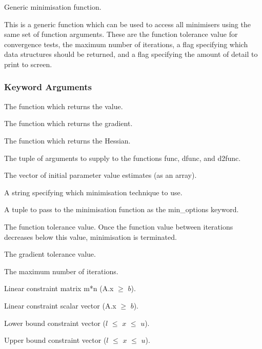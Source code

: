  Generic minimisation function. 
  

 This is a generic function which can be used to access all minimisers using the same set of function arguments.  These are the function tolerance value for convergence tests, the maximum number of iterations, a flag specifying which data structures should be returned, and a flag specifying the amount of detail to print to screen. 
  

  
 \subsubsection{Keyword Arguments} 

   The function which returns the value.   

   The function which returns the gradient.   

   The function which returns the Hessian.   

   The tuple of arguments to supply to the functions func, dfunc, and d2func.   

   The vector of initial parameter value estimates (as an array).   

   A string specifying which minimisation technique to use.   

   A tuple to pass to the minimisation function as the min\_options keyword.   

   The function tolerance value.  Once the function value between iterations decreases below this value, minimisation is terminated.   

   The gradient tolerance value.   

   The maximum number of iterations.   

   Linear constraint matrix m*n (A.x $\ge$ $b$).   

   Linear constraint scalar vector (A.x $\ge$ $b$).   

   Lower bound constraint vector ($l$ $\le$ $x$ $\le$ $u$).   

   Upper bound constraint vector ($l$ $\le$ $x$ $\le$ $u$).   

